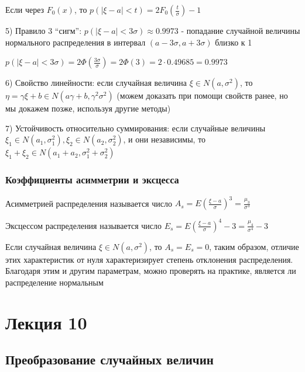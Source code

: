 \documentclass[12pt]{article}
\begin{document}
    \Notas Если через $F_0(x)$, то $p(|\xi - a| < t) = 2F_0\left(\frac{t}{\sigma}\right) - 1$

    5) Правило 3 \enquote{сигм}: $p(|\xi - a| < 3\sigma) \approx 0.9973$ - попадание случайной величины нормального распределения в интервал $(a - 3\sigma, a + 3\sigma)$ близко к 1

    \begin{MyProof}
        $p(|\xi - a| < 3\sigma) = 2\Phi\left(\frac{3\sigma}{\sigma}\right) = 2\Phi(3) = 2 \cdot 0.49685 = 0.9973$
    \end{MyProof}

    6) Свойство линейности: если случайная величина $\xi \in N(a, \sigma^2)$, то $\eta = \gamma \xi + b \in N(a \gamma + b, \gamma^2 \sigma^2)$ (можем доказать при помощи свойств ранее, но мы докажем позже, используя другие методы)

    7) Устойчивость относительно суммирования: если случайные величины $\xi_1 \in N(a_1, \sigma_1^2), \xi_2 \in N(a_2, \sigma_2^2)$, и они независимы, то $\xi_1 + \xi_2 \in N(a_1 + a_2, \sigma^2_1 + \sigma^2_2)$

    \subsubsection{Коэффициенты асимметрии и эксцесса}

     Асимметрией распределения называется число $A_s = E\left(\frac{\xi - a}{\sigma}\right)^3 = \frac{\mu_3}{\sigma^3}$

     Эксцессом распределения называется число $E_s = E\left(\frac{\xi - a}{\sigma}\right)^4 - 3 = \frac{\mu_4}{\sigma^4} - 3$

    \Notas Если случайная величина $\xi \in N(a, \sigma^2)$, то $A_s = E_s = 0$, таким образом, отличие этих характеристик от нуля характеризирует 
    степень отклонения распределения. Благодаря этим и другим параметрам, можно проверять на практике, является ли распределение нормальным 


    \section{Лекция 10}

    \hypertarget{randomvaluetransformation}{}

    \subsection{Преобразование случайных величин}
\end{document}
